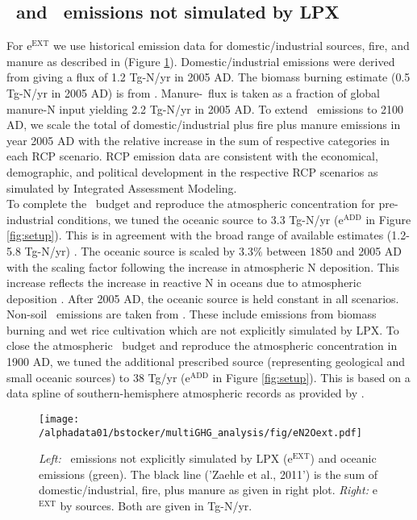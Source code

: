 \subsection{\nno\ and \chh\ emissions not simulated by LPX}
\label{sec:eghgext}

For e\nno$^{\mathrm{EXT}}$ we use historical emission data for domestic/industrial sources, fire, and manure as described in \citet{zaehle11ngeo} (Figure \ref{fig:eN2Oext}). Domestic/industrial emissions were derived from \citet{vanaardenne01gbc} giving a flux of 1.2 Tg\nno -N/yr in 2005 AD. The biomass burning estimate (0.5 Tg\nno -N/yr in 2005 AD) is from \citet{davidson09natgeo}. Manure-\nno\ flux is taken as a fraction of global manure-N input yielding 2.2 Tg\nno -N/yr in 2005 AD. To extend \nno\ emissions to 2100 AD, we scale the total of domestic/industrial plus fire plus manure emissions in year 2005 AD with the relative increase in the sum of respective categories in each RCP scenario. RCP emission data are consistent with the economical, demographic, and political development in the respective RCP scenarios as simulated by Integrated Assessment Modeling.\\

To complete the \nno\ budget and reproduce the atmospheric concentration for pre-industrial conditions, we tuned the oceanic source to 3.3 Tg\nno -N/yr (e\nno $^\mathrm{ADD}$ in Figure \ref{fig:setup}). This is in agreement with the broad range of available estimates (1.2-5.8 Tg\nno -N/yr) \citep{hirsch06gbc, denman07ipcc, rhee09jgr}. The oceanic source is scaled by 3.3$\%$ between 1850 and 2005 AD with the scaling factor following the increase in atmospheric N deposition. This increase reflects the increase in reactive N in oceans due to atmospheric deposition \citep{sunth12grl}. After 2005 AD, the oceanic source is held constant in all scenarios.\\

Non-soil \chh\ emissions are taken from \citet{RCPdatabase}. These include emissions from biomass burning and wet rice cultivation which are not explicitly simulated by LPX. To close the atmospheric \chh\ budget and reproduce the atmospheric concentration in 1900 AD, we tuned the additional prescribed source (representing geological and small oceanic sources) to 38 Tg\chh /yr (e\chh $^\mathrm{ADD}$ in Figure \ref{fig:setup}). This is based on a data spline of southern-hemisphere atmospheric records as provided by \citet{RCPdatabase}.

\begin{figure}[ht!]
\begin{center}
\noindent\texttt{[image: /alphadata01/bstocker/multiGHG\_analysis/fig/eN2Oext.pdf]}
\end{center}
\caption[Prescribed external \nno\ emissions]{{\it Left:} \nno\ emissions not explicitly simulated by LPX (e\nno $^{\mathrm{EXT}}$) and oceanic emissions (green). The black line ('Zaehle et al., 2011') is the sum of domestic/industrial, fire, plus manure as given in right plot. {\it Right:} e\nno $^{\mathrm{EXT}}$ by sources. Both are given in Tg\nno -N/yr.}
\label{fig:eN2Oext}
\end{figure}


